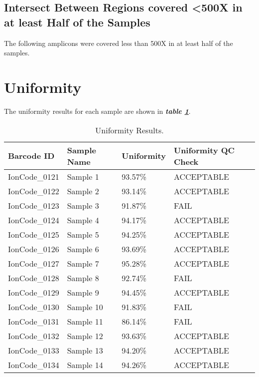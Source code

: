 \documentclass[
]{article}
\newenvironment{Shaded}{}{}
\newcommand{\NormalTok}[1]{#1}
\begin{document}
\hypertarget{intersect-between-regions-covered-500x-in-at-least-half-of-the-samples}{%
\subsection{Intersect Between Regions covered \textless500X in at least Half of the Samples}\label{intersect-between-regions-covered-500x-in-at-least-half-of-the-samples}}

The following amplicons were covered less than 500X in at least half of the samples.

\begin{Shaded}
\end{Shaded}

\newpage

\hypertarget{uniformity}{%
\section{Uniformity}\label{uniformity}}

The uniformity results for each sample are shown in \textbf{\emph{table \ref{tab:uniformityTable}}}.

\begin{longtable}[t]{llll}
\caption{\label{tab:uniformityTable}Uniformity Results.}\\
\toprule
Barcode ID & Sample Name & Uniformity & Uniformity QC Check\\
\midrule
IonCode\_0121 & Sample 1 & 93.57\% & ACCEPTABLE\\
IonCode\_0122 & Sample 2 & 93.14\% & ACCEPTABLE\\
IonCode\_0123 & Sample 3 & 91.87\% & FAIL\\
IonCode\_0124 & Sample 4 & 94.17\% & ACCEPTABLE\\
IonCode\_0125 & Sample 5 & 94.25\% & ACCEPTABLE\\
\addlinespace
IonCode\_0126 & Sample 6 & 93.69\% & ACCEPTABLE\\
IonCode\_0127 & Sample 7 & 95.28\% & ACCEPTABLE\\
IonCode\_0128 & Sample 8 & 92.74\% & FAIL\\
IonCode\_0129 & Sample 9 & 94.45\% & ACCEPTABLE\\
IonCode\_0130 & Sample 10 & 91.83\% & FAIL\\
\addlinespace
IonCode\_0131 & Sample 11 & 86.14\% & FAIL\\
IonCode\_0132 & Sample 12 & 93.63\% & ACCEPTABLE\\
IonCode\_0133 & Sample 13 & 94.20\% & ACCEPTABLE\\
IonCode\_0134 & Sample 14 & 94.26\% & ACCEPTABLE\\
\bottomrule
\end{longtable}
\end{document}

